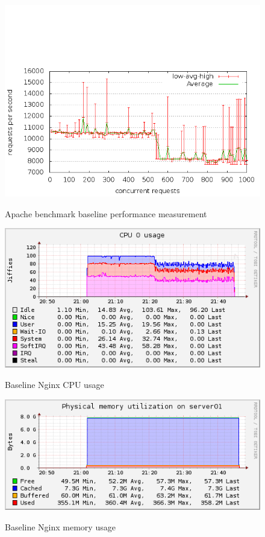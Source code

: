 \documentclass[Measurements]{subfiles}
\begin{document}
\begin{figure}[H]
\caption{Apache benchmark baseline performance measurement}
\centering
\includegraphics[scale=0.55] {images/results/200_with_naxsi_core_rules_configured/output.png}
\label{fig:Baseline performance measurement}
\end{figure}

\begin{figure}[H]
\centering
\caption{Baseline Nginx CPU usage}
\includegraphics[scale=0.7]{images/results/200_with_naxsi_core_rules_configured/cpu.png}
\label{fig:Baseline Nginx CPU usage}
\end{figure}

\begin{figure}[H]
\centering
\caption{Baseline Nginx memory usage}
\includegraphics[scale=0.7]{images/results/200_with_naxsi_core_rules_configured/memory.png}
\label{fig:Baseline Nginx memory usage}
\end{figure}
\end{document}
